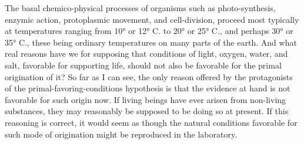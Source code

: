 \documentclass[a4paper, 11pt, oneside, polutonikogreek, english, landscape]{article}
\begin{document}
The basal chemico-physical processes of organisms such as photo-synthesis, enzymic action, protoplasmic movement, and cell-division, proceed most typically at temperatures ranging from 10° or 12° C. to 20° or 25° C., and perhaps 30° or 35° C., these being ordinary temperatures on many parts of the earth. And what real reasons have we for supposing that conditions of light, oxygen, water, and salt, favorable for supporting life, should not also be favorable for the primal origination of it? So far as I can see, the only reason offered by the protagonists of the primal-favoring-conditions hypothesis is that the evidence at hand is not favorable for such origin now. If living beings have ever arisen from non-living substances, they may reasonably be supposed to be doing so at present. If this reasoning is correct, it would seem as though the natural conditions favorable for such mode of origination might be reproduced in the laboratory.
\end{document}
